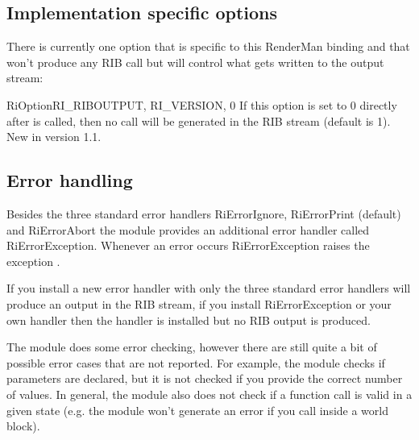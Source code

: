 \subsection{Implementation specific options}

There is currently one option that is specific to this RenderMan
binding and that won't produce any RIB call but will control what gets
written to the output stream:

\begin{funcdesc}{RiOption}{RI_RIBOUTPUT, RI_VERSION, 0}
If this option is set to 0 directly after  is
called, then no  call will be generated in the RIB stream
(default is 1).\\
New in version 1.1.
\end{funcdesc}

\subsection{Error handling}

Besides the three standard error handlers RiErrorIgnore, RiErrorPrint
(default) and RiErrorAbort the module provides an additional error
handler called RiErrorException. Whenever an error occurs
RiErrorException raises the exception .

If you install a new error handler with 
only the three standard error handlers will produce an output in the
RIB stream, if you install RiErrorException or your own handler then
the handler is installed but no RIB output is produced.

The module does some error checking, however there are still quite a
bit of possible error cases that are not reported. For example, the
module checks if parameters are declared, but it is not checked if you
provide the correct number of values. In general, the module also does
not check if a function call is valid in a given state (e.g. the
module won't generate an error if you call 
inside a world block).


